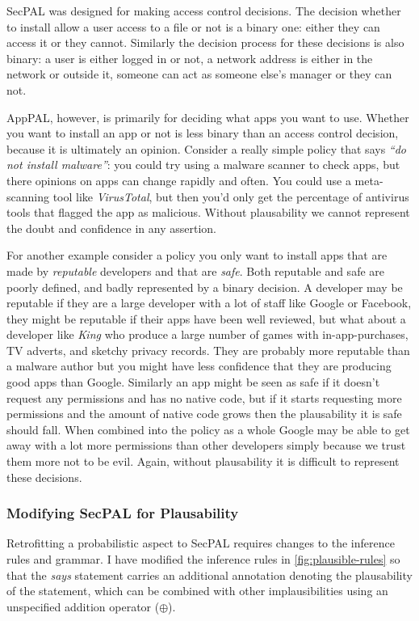 \documentclass[a4paper]{scrartcl}
\begin{document}
SecPAL was designed for making access control decisions. The decision whether to
install allow a user access to a file or not is a binary one: either they can
access it or they cannot. Similarly the decision process for these decisions is
also binary: a user is either logged in or not, a network address is either in
the network or outside it, someone can act as someone else's manager or they can
not.

AppPAL, however, is primarily for deciding what apps you want to use. Whether
you want to install an app or not is less binary than an access control
decision, because it is ultimately an opinion. Consider a really simple policy
that says \emph{``do not install malware''}: you could try using a malware
scanner to check apps, but there opinions on apps can change rapidly and often.
You could use a meta-scanning tool like \emph{VirusTotal}, but then you'd only
get the percentage of antivirus tools that flagged the app as malicious. Without
plausability we cannot represent the doubt and confidence in any assertion.

For another example consider a policy you only want to install apps that are
made by \emph{reputable} developers and that are \emph{safe}. Both reputable and
safe are poorly defined, and badly represented by a binary decision. A developer
may be reputable if they are a large developer with a lot of staff like Google
or Facebook, they might be reputable if their apps have been well reviewed, but
what about a developer like \emph{King} who produce a large number of games with
in-app-purchases, TV adverts, and sketchy privacy records. They are probably
more reputable than a malware author but you might have less confidence that
they are producing good apps than Google. Similarly an app might be seen as safe
if it doesn't request any permissions and has no native code, but if it starts
requesting more permissions and the amount of native code grows then the
plausability it is safe should fall. When combined into the policy as a whole
Google may be able to get away with a lot more permissions than other developers
simply because we trust them more not to be evil. Again, without plausability it
is difficult to represent these decisions.

\subsubsection*{Modifying SecPAL for Plausability}

Retrofitting a probabilistic aspect to SecPAL requires changes to the inference
rules and grammar. I have modified the inference rules in
\autoref{fig:plausible-rules} so that the \emph{says} statement carries an
additional annotation denoting the plausability of the statement, which can be
combined with other implausibilities using an unspecified addition operator
($\oplus$).
\end{document}
